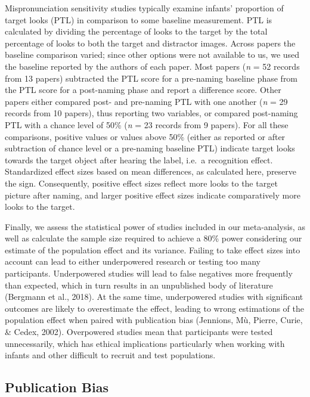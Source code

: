 \documentclass[man]{apa6}
\begin{document}
Mispronunciation sensitivity studies typically examine infants' proportion of target looks (PTL) in comparison to some baseline measurement. PTL is calculated by dividing the percentage of looks to the target by the total percentage of looks to both the target and distractor images. Across papers the baseline comparison varied; since other options were not available to us, we used the baseline reported by the authors of each paper. Most papers (\emph{n} = 52 records from 13 papers) subtracted the PTL score for a pre-naming baseline phase from the PTL score for a post-naming phase and report a difference score. Other papers either compared post- and pre-naming PTL with one another (\emph{n} = 29 records from 10 papers), thus reporting two variables, or compared post-naming PTL with a chance level of 50\% (\emph{n} = 23 records from 9 papers). For all these comparisons, positive values or values above 50\% (either as reported or after subtraction of chance level or a pre-naming baseline PTL) indicate target looks towards the target object after hearing the label, i.e.~a recognition effect. Standardized effect sizes based on mean differences, as calculated here, preserve the sign. Consequently, positive effect sizes reflect more looks to the target picture after naming, and larger positive effect sizes indicate comparatively more looks to the target.

Finally, we assess the statistical power of studies included in our meta-analysis, as well as calculate the sample size required to achieve a 80\% power considering our estimate of the population effect and its variance. Failing to take effect sizes into account can lead to either underpowered research or testing too many participants. Underpowered studies will lead to false negatives more frequently than expected, which in turn results in an unpublished body of literature (Bergmann et al., 2018). At the same time, underpowered studies with significant outcomes are likely to overestimate the effect, leading to wrong estimations of the population effect when paired with publication bias (Jennions, Mù, Pierre, Curie, \& Cedex, 2002). Overpowered studies mean that participants were tested unnecessarily, which has ethical implications particularly when working with infants and other difficult to recruit and test populations.

\hypertarget{publication-bias}{%
\subsection{Publication Bias}\label{publication-bias}}
\end{document}
